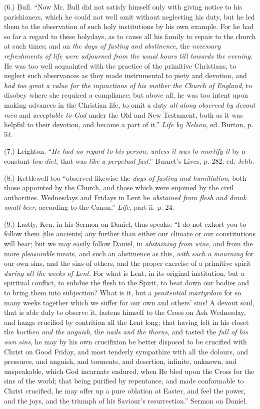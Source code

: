 (6.) Bull. ``Now Mr. Bull did not satisfy himself
only with giving notice to his parishioners, which he could not well
omit without neglecting his duty, but he led them to the observation
of such holy institutions by his own example. For he had so far a
regard to these holydays, as to cause all his family to repair to the
church at such times; and on \emph{the days of fasting and abstinence},
the \emph{necessary refreshments of life were adjourned from the usual hours
till towards the evening}. He was too well acquainted with the
practice of the primitive Christians, to neglect such observances as
they made instrumental to piety and devotion, and \emph{had too great a
value for the injunctions of his mother the Church of England}, to
disobey where she required a compliance; but above all, he was too
intent upon making advances in the Christian life, to omit a duty \emph{all
along observed by devout men} and \emph{acceptable to God} under
the Old and New Testament, both as it was helpful to their devotion,
and became a part of it.'' \emph{Life by Nelson}, ed. Burton, p. 54.

(7.) Leighton. ``\emph{He had no regard to his
person, unless it was to mortify it} by a constant \emph{low diet},
that was \emph{like a perpetual fast}.'' Burnet's Lives, p. 282. ed.
Jebb.

(8.) Kettlewell too ``observed likewise the \emph{days
of fasting and humiliation}, both those appointed by the Church,
and those which were enjoined by the civil authorities. Wednesdays and
Fridays in Lent he \emph{abstained from flesh and drank small beer},
according to the Canon.'' \emph{Life}, part ii. p. 24.

(9.) Lastly, Ken, in his Sermon on Daniel, thus
speaks: ``I do not exhort you to follow them [the ancients] any further
than either our climate or our constitutions will bear; but we may
easily follow Daniel, in \emph{abstaining from} \emph{wine}, and
from the more \emph{pleasurable} meats, and such an abstinence as
this, \emph{with such a mourning} for our own sins, and the sins of
others, and the proper exercise of a primitive spirit \emph{during all
the weeks of Lent}. For what is Lent, in its original institution,
but a spiritual conflict, to subdue the flesh to the Spirit, to beat
down our bodies and to bring them into subjection? What is it, but a \emph{penitential
martyrdom} for so many weeks together which we suffer for our own
and others' sins! A devout soul, that is able duly to observe it,
fastens himself to the Cross on Ash Wednesday, and hangs crucified by
contrition all the Lent long; that having felt in his closet the \emph{burthen
and the anguish}, the \emph{nails and the thorns}, and tasted the \emph{full
of his own sins}, he may by his own crucifixion be better disposed
to be crucified with Christ on Good Friday, and most tenderly
sympathize with all the dolours, and pressures, and anguish, and
torments, and desertion, infinite, unknown, and unspeakable, which God
incarnate endured, when He bled upon the Cross for the sins of the
world; that being purified by repentance, and made conformable to
Christ crucified, he may offer up a pure oblation at Easter, and feel
the power, and the joys, and the triumph of his Saviour's
resurrection.'' Sermon on Daniel.

